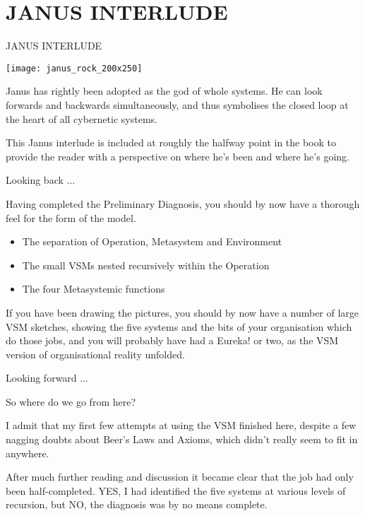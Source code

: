 \chapter*{JANUS INTERLUDE}\label{JANUS INTERLUDE}
  {JANUS INTERLUDE}

\begin{center}
\texttt{[image: janus\_rock\_200x250]}
\end{center}

Janus has rightly been adopted as the god of whole systems. He can look forwards and backwards simultaneously, and thus symbolises the closed loop at the heart of all cybernetic systems.

This Janus interlude is included at roughly the halfway point in the book to provide the reader with a perspective on where he's been and where he's going.

Looking back ...

Having completed the Preliminary Diagnosis, you should by now have a thorough feel for the form of the model.

\begin{itemize}
  \item The separation of Operation, Metasystem and Environment

  \item The small VSMs nested recursively within the Operation

  \item The four Metasystemic functions

\end{itemize}

If you have been drawing the pictures, you should by now have a number of large VSM sketches, showing the five systems and the bits of your organisation which do those jobs, and you will probably have had a Eureka! or two, as the VSM version of organisational reality unfolded.

Looking forward ...

So where do we go from here?

I admit that my first few attempts at using the VSM finished here, despite a few nagging doubts about Beer's Laws and Axioms, which didn't really seem to fit in anywhere.

After much further reading and discussion it became clear that the job had only been half-completed. YES, I had identified the five systems at various levels of recursion, but NO, the diagnosis was by no means complete.


